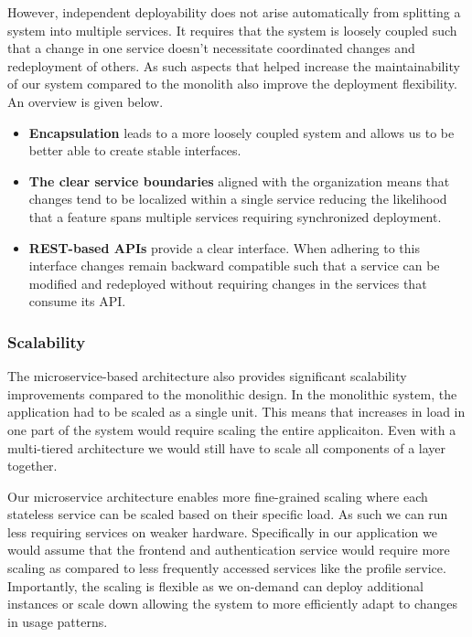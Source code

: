 However, independent deployability does not arise automatically from splitting a system into multiple services.
It requires that the system is loosely coupled such that a change in one service doesn't necessitate coordinated
changes and redeployment of others.
As such aspects that helped increase the maintainability of our system compared to the monolith also improve
the deployment flexibility. An overview is given below.

\begin{itemize}
   \item \textbf{Encapsulation} leads to a more loosely coupled system and allows us to be better able to create stable interfaces.
   \item \textbf{The clear service boundaries} aligned with the organization means that changes tend to be localized within a single service reducing the 
   likelihood that a feature spans multiple services requiring synchronized deployment.
   \item \textbf{REST-based APIs} provide a clear interface.
   When adhering to this interface changes remain backward compatible such that a service can be modified and 
   redeployed without requiring changes in the services that consume its API. 
\end{itemize}

\subsubsection{Scalability}

The microservice-based architecture also provides significant scalability improvements compared to the monolithic design.
In the monolithic system, the application had to be scaled as a single unit.
This means that increases in load in one part of the system would require scaling the entire applicaiton.
Even with a multi-tiered architecture we would still have to scale all components of a layer together.

Our microservice architecture enables more fine-grained scaling where each 
stateless service can be scaled based on their specific load. As such we can run less requiring
services on weaker hardware.
Specifically in our application we would assume that the frontend and authentication service
would require more scaling as compared to less frequently accessed services like the profile service.
Importantly, the scaling is flexible as we on-demand can deploy additional instances or scale down
allowing the system to more efficiently adapt to changes in usage patterns.

